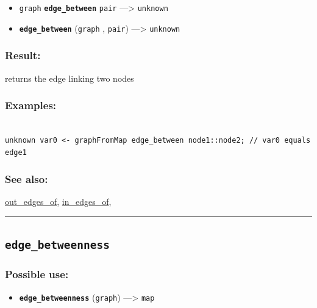 \documentclass[]{book}
\providecommand{\tightlist}{%
  \setlength{\itemsep}{0pt}\setlength{\parskip}{0pt}}
\theoremstyle{definition}
\theoremstyle{definition}
\theoremstyle{definition}
\theoremstyle{remark}
\begin{document}
\begin{itemize}
\tightlist
\item
  \texttt{graph} \textbf{\texttt{edge\_between}} \texttt{pair}
  ---\textgreater{} \texttt{unknown}
\item
  \textbf{\texttt{edge\_between}} (\texttt{graph} , \texttt{pair})
  ---\textgreater{} \texttt{unknown}
\end{itemize}

\subsubsection{Result:}\label{result-140}

returns the edge linking two nodes

\subsubsection{Examples:}\label{examples-109}

\begin{verbatim}
 
unknown var0 <- graphFromMap edge_between node1::node2; // var0 equals edge1
\end{verbatim}

\subsubsection{See also:}\label{see-also-85}

\href{operators-n-to-r.html\#out_edges_of}{out\_edges\_of},
\href{operators-i-to-m.html\#in_edges_of}{in\_edges\_of},

\begin{center}\rule{0.5\linewidth}{\linethickness}\end{center}

\subsection{\texorpdfstring{\texttt{edge\_betweenness}}{edge\_betweenness}}\label{edge_betweenness}

\subsubsection{Possible use:}\label{possible-use-146}

\begin{itemize}
\tightlist
\item
  \textbf{\texttt{edge\_betweenness}} (\texttt{graph}) ---\textgreater{}
  \texttt{map}
\end{itemize}
\end{document}
